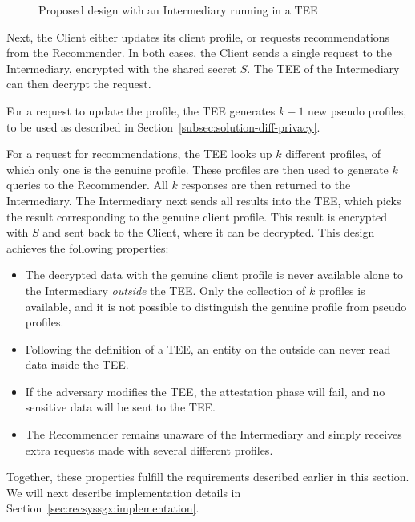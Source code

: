 {\begin{figure}[h]
	\caption{Proposed design with an Intermediary running in a TEE}
	\label{fig:tee-privacy}
\end{figure}


Next, the Client either updates its client profile, or requests recommendations from the Recommender.
In both cases, the Client sends a single request to the Intermediary, encrypted with the shared secret $S$.
The TEE of the Intermediary can then decrypt the request.

For a request to update the profile, the TEE generates $k-1$ new pseudo profiles, to be used as described in Section~\ref{subsec:solution-diff-privacy}.

For a request for recommendations, the TEE looks up $k$ different profiles, of which only one is the genuine profile.
These profiles are then used to generate $k$ queries to the Recommender.
All $k$ responses are then returned to the Intermediary.
The Intermediary next sends all results into the TEE, which picks the result corresponding to the genuine client profile.
This result is encrypted with $S$ and sent back to the Client, where it can be decrypted.
This design achieves the following properties:
\begin{itemize}
	\item The decrypted data with the genuine client profile is never available alone to the Intermediary \emph{outside} the TEE. 
	Only the collection of $k$ profiles is available, and it is not possible to distinguish the genuine profile from pseudo profiles.
	\item Following the definition of a TEE, an entity on the outside can never read data inside the TEE.
	\item If the adversary modifies the TEE, the attestation phase will fail, and no sensitive data will be sent to the TEE.
	\item The Recommender remains unaware of the Intermediary and simply receives extra requests made with several different profiles.
\end{itemize}
Together, these properties fulfill the requirements described earlier in this section.
We will next describe implementation details in Section~\ref{sec:recsyssgx:implementation}.

}
